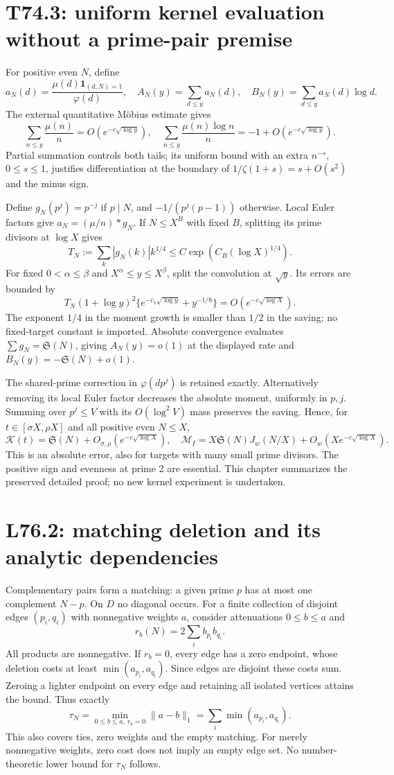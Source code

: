 \documentclass[11pt,a4paper]{article}
\newcommand{\Sg}{\mathfrak S}\newcommand{\e}{\mathrm e}
\begin{document}
\section{T74.3: uniform kernel evaluation without a prime-pair premise}
For positive even $N$, define
\[
 a_N(d)=\frac{\mu(d)\mathbf1_{(d,N)=1}}{\varphi(d)},\quad
 A_N(y)=\sum_{d\le y}a_N(d),\quad B_N(y)=\sum_{d\le y}a_N(d)\log d.
\]
The external quantitative M\"obius estimate gives
\[
 \sum_{n\le y}\frac{\mu(n)}n=O(e^{-c\sqrt{\log y}}),\quad
 \sum_{n\le y}\frac{\mu(n)\log n}{n}=-1+O(e^{-c\sqrt{\log y}}).
\]
Partial summation controls both tails; its uniform bound with an extra $n^{-s}$, $0\le s\le1$, justifies differentiation at the boundary of $1/\zeta(1+s)=s+O(s^2)$ and the minus sign.

Define $g_N(p^j)=p^{-j}$ if $p\mid N$, and $-1/(p^j(p-1))$ otherwise. Local Euler factors give $a_N=(\mu/n)*g_N$. If $N\le X^B$ with fixed $B$, splitting its prime divisors at $\log X$ gives
\[
 T_N:=\sum_k|g_N(k)|k^{1/4}\le C\exp(C_B(\log X)^{1/4}).
\]
For fixed $0<\alpha\le\beta$ and $X^\alpha\le y\le X^\beta$, split the convolution at $\sqrt y$. Its errors are bounded by
\[
 T_N(1+\log y)^2\{e^{-c_1\sqrt{\log y}}+y^{-1/8}\}
 =O(e^{-c\sqrt{\log X}}).
\]
The exponent $1/4$ in the moment growth is smaller than $1/2$ in the saving; no fixed-target constant is imported. Absolute convergence evaluates $\sum g_N=\Sg(N)$, giving $A_N(y)=o(1)$ at the displayed rate and $B_N(y)=-\Sg(N)+o(1)$.

The shared-prime correction in $\varphi(dp^j)$ is retained exactly. Alternatively removing its local Euler factor decreases the absolute moment, uniformly in $p,j$. Summing over $p^j\le V$ with its $O(\log^2V)$ mass preserves the saving. Hence, for $t\in[\sigma X,\rho X]$ and all positive even $N\le X$,
\[
 \mathcal K(t)=\Sg(N)+O_{\sigma,\rho}(e^{-c\sqrt{\log X}}),\quad
 \mathcal M_I=X\Sg(N)J_w(N/X)+O_w(Xe^{-c\sqrt{\log X}}).
\]
This is an absolute error, also for targets with many small prime divisors. The positive sign and evenness at prime 2 are essential. This chapter summarizes the preserved detailed proof; no new kernel experiment is undertaken.
\newpage
\section{L76.2: matching deletion and its analytic dependencies}
Complementary pairs form a matching: a given prime $p$ has at most one complement $N-p$. On $D$ no diagonal occurs. For a finite collection of disjoint edges $(p_i,q_i)$ with nonnegative weights $a$, consider attenuations $0\le b\le a$ and
\[
 r_b(N)=2\sum_i b_{p_i}b_{q_i}.
\]
All products are nonnegative. If $r_b=0$, every edge has a zero endpoint, whose deletion costs at least $\min(a_{p_i},a_{q_i})$. Since edges are disjoint these costs sum. Zeroing a lighter endpoint on every edge and retaining all isolated vertices attains the bound. Thus exactly
\[
 \tau_N=\min_{0\le b\le a,\ r_b=0}\|a-b\|_1
       =\sum_i\min(a_{p_i},a_{q_i}).
\]
This also covers ties, zero weights and the empty matching. For merely nonnegative weights, zero cost does not imply an empty edge set. No number-theoretic lower bound for $\tau_N$ follows.
\end{document}
